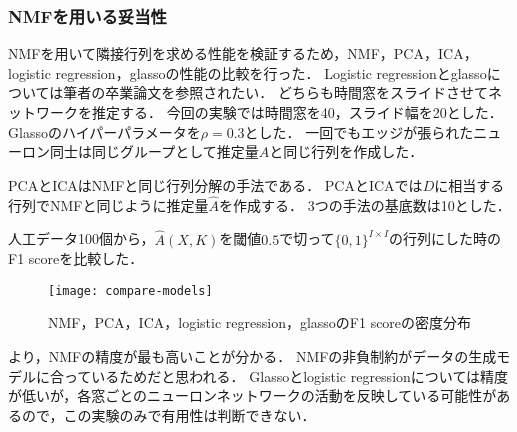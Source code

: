 \subsubsection{NMFを用いる妥当性}
NMFを用いて隣接行列を求める性能を検証するため，NMF，PCA，ICA，logistic regression，glassoの性能の比較を行った．
Logistic regressionとglassoについては筆者の卒業論文\cite{2018Nagayama}を参照されたい．
どちらも時間窓をスライドさせてネットワークを推定する．
今回の実験では時間窓を40，スライド幅を20とした．
Glassoのハイパーパラメータを$\rho = 0.3$とした．
一回でもエッジが張られたニューロン同士は同じグループとして推定量$\hat{A}$と同じ行列を作成した．

PCAとICAはNMFと同じ行列分解の手法\cite{Cichocki2009}である．
PCAとICAでは$D$に相当する行列でNMFと同じように推定量$\hat{A}$を作成する．
3つの手法の基底数は10とした．

人工データ100個から，$\hat{A}(X,K)$を閾値$0.5$で切って$\{0,1\}^{I \times I}$の行列にした時のF1 scoreを比較した．
\begin{figure}[htbp]
    \begin{center}
        \texttt{[image: compare-models]}
        \caption{NMF，PCA，ICA，logistic regression，glassoのF1 scoreの密度分布}
        \label{fig:compare-models}
    \end{center}
\end{figure}
より，NMFの精度が最も高いことが分かる．
NMFの非負制約がデータの生成モデルに合っているためだと思われる．
Glassoとlogistic regressionについては精度が低いが，各窓ごとのニューロンネットワークの活動を反映している可能性があるので，この実験のみで有用性は判断できない．

